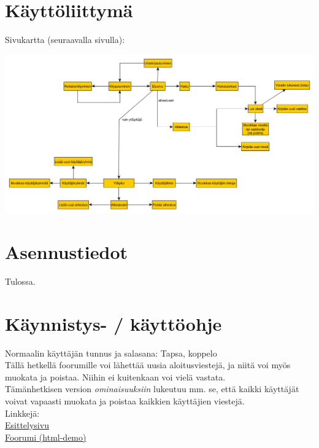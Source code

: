 \documentclass[12pt,a4paper,leqno]{report}
\begin{document}
\chapter{Käyttöliittymä}

Sivukartta (seuraavalla sivulla):

\begin{sideways}
\includegraphics[scale=.6]{sivukartta}
\end{sideways}

\chapter{Asennustiedot}

Tulossa.

\chapter{Käynnistys- / käyttöohje}

Normaalin käyttäjän tunnus ja salasana: Tapsa, koppelo\\

\noindent Tällä hetkellä foorumille voi lähettää uusia aloitusviestejä, ja niitä voi myös muokata ja poistaa. Niihin ei kuitenkaan voi vielä vastata.\\

\noindent Tämänhetkisen version \emph{ominaisuuksiin} lukeutuu mm. se, että kaikki käyttäjät voivat vapaasti muokata ja poistaa kaikkien käyttäjien viestejä.\\

\noindent Linkkejä:\\
\href{http://wlehtoma.users.cs.helsinki.fi/Keskustelufoorumi/esittelysivu.html}{Esittelysivu}\\
\href{http://wlehtoma.users.cs.helsinki.fi/Keskustelufoorumi/html-demo/}{Foorumi (html-demo)}
\end{document}
